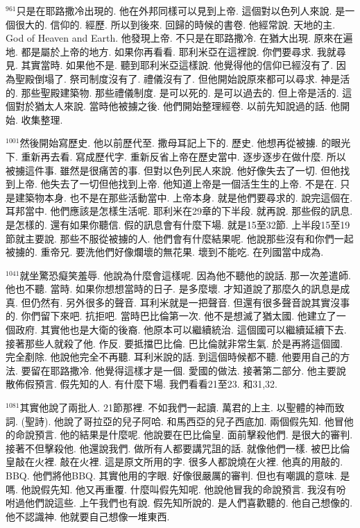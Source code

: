 \documentclass{book}
\begin{document}
$^{961}$只是在耶路撒冷出現的.
他在外邦同樣可以見到上帝.
這個對以色列人來說.
是一個很大的.
信仰的.
經歷.
所以到後來.
回歸的時候的書卷.
他經常說.
天地的主.
God of Heaven and Earth.
他發現上帝.
不只是在耶路撒冷.
在猶大出現.
原來在遍地.
都是屬於上帝的地方.
如果你再看看.
耶利米亞在這裡說.
你們要尋求.
我就尋見.
其實當時.
如果他不是.
聽到耶利米亞這樣說.
他覺得他的信仰已經沒有了.
因為聖殿倒塌了.
祭司制度沒有了.
禮儀沒有了.
但他開始說原來都可以尋求.
神是活的.
那些聖殿建築物.
那些禮儀制度.
是可以死的.
是可以過去的.
但上帝是活的.
這個對於猶太人來說.
當時他被擄之後.
他們開始整理經卷.
以前先知說過的話.
他開始.
收集整理.

$^{1001}$然後開始寫歷史.
他以前歷代至.
撒母耳記上下的.
歷史.
他想再從被擄.
的眼光下.
重新再去看.
寫成歷代字.
重新反省上帝在歷史當中.
逐步逐步在做什麼.
所以被擄這件事.
雖然是很痛苦的事.
但對以色列民人來說.
他好像失去了一切.
但他找到上帝.
他失去了一切但他找到上帝.
他知道上帝是一個活生生的上帝.
不是在.
只是建築物本身.
也不是在那些活動當中.
上帝本身.
就是他們要尋求的.
說完這個在.
耳邦當中.
他們應該是怎樣生活呢.
耶利米在29章的下半段.
就再說.
那些假的訊息.
是怎樣的.
還有如果你聽信.
假的訊息會有什麼下場.
就是15至32節.
上半段15至19節就主要說.
那些不服從被擄的人.
他們會有什麼結果呢.
他說那些沒有和你們一起被擄的.
重帝兄.
要洗他們好像爛壞的無花果.
壞到不能吃.
在列國當中成為.

$^{1041}$就坐驚恐癡笑羞辱.
他說為什麼會這樣呢.
因為他不聽他的說話.
那一次差遣師.
他也不聽.
當時.
如果你想想當時的日子.
是多麼壞.
才知道說了那麼久的訊息是成真.
但仍然有.
另外很多的聲音.
耳利米就是一把聲音.
但還有很多聲音說其實沒事的.
你們留下來吧.
抗拒吧.
當時巴比倫第一次.
他不是想滅了猶太國.
他建立了一個政府.
其實他也是大衛的後裔.
他原本可以繼續統治.
這個國可以繼續延續下去.
接著那些人就殺了他.
作反.
要抵擋巴比倫.
巴比倫就非常生氣.
於是再將這個國.
完全剷除.
他說他完全不再聽.
耳利米說的話.
到這個時候都不聽.
他要用自己的方法.
要留在耶路撒冷.
他覺得這樣才是一個.
愛國的做法.
接著第二部分.
他主要說散佈假預言.
假先知的人.
有什麼下場.
我們看看21至23.
和31,32.

$^{1081}$其實他說了兩批人.
21節那裡.
不如我們一起讀.
萬君的上主.
以聖體的神而致詞.
(聖詩).
他說了哥拉亞的兒子阿哈.
和馬西亞的兒子西底加.
兩個假先知.
他冒他的命說預言.
他的結果是什麼呢.
他說要在巴比倫皇.
面前擊殺他們.
是很大的審判.
接著不但擊殺他.
他還說我們.
做所有人都要講咒詛的話.
就像他們一樣.
被巴比倫皇敲在火裡.
敲在火裡.
這是原文所用的字.
很多人都說燒在火裡.
他真的用敲的.
BBQ.
他們將他BBQ.
其實他用的字眼.
好像很嚴厲的審判.
但也有嘲諷的意味.
是嗎.
他說假先知.
他又再重覆.
什麼叫假先知呢.
他說他冒我的命說預言.
我沒有吩咐過他們說這些.
上午我們也有說.
假先知所說的.
是人們喜歡聽的.
他自己想像的.
他不認識神.
他就要自己想像一堆東西.
\end{document}

